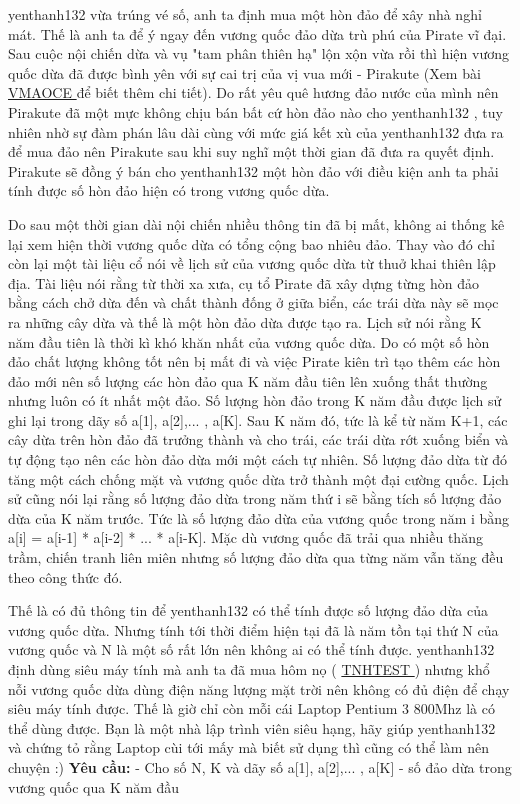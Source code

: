 yenthanh132 vừa trúng vé số, anh ta định mua một hòn đảo để xây nhà nghỉ mát. Thế là anh ta để ý ngay đến vương quốc đảo dừa trù phú của Pirate vĩ đại. Sau cuộc nội chiến dừa và vụ "tam phân thiên hạ" lộn xộn vừa rồi thì hiện vương quốc dừa đã được bình yên với sự cai trị của vị vua mới - Pirakute (Xem bài \href{../../VMAOCE/}{ VMAOCE } để biết thêm chi tiết). Do rất yêu quê hương đảo nước của mình nên Pirakute đã một mực không chịu bán bất cứ hòn đảo nào cho yenthanh132 , tuy nhiên nhờ sự đàm phán lâu dài cùng với mức giá kết xù của yenthanh132 đưa ra để mua đảo nên Pirakute sau khi suy nghĩ một thời gian đã đưa ra quyết định. Pirakute sẽ đồng ý bán cho yenthanh132 một hòn đảo với điều kiện anh ta phải tính được số hòn đảo hiện có trong vương quốc dừa.





Do sau một thời gian dài nội chiến nhiều thông tin đã bị mất, không ai thống kê lại xem hiện thời vương quốc dừa có tổng cộng bao nhiêu đảo. Thay vào đó chỉ còn lại một tài liệu cổ nói về lịch sử của vương quốc dừa từ thuở khai thiên lập địa. Tài liệu nói rằng từ thời xa xưa, cụ tổ Pirate đã xây dựng từng hòn đảo bằng cách chở dừa đến và chất thành đống ở giữa biển, các trái dừa này sẽ mọc ra những cây dừa và thế là một hòn đảo dừa được tạo ra. Lịch sử nói rằng K năm đầu tiên là thời kì khó khăn nhất của vương quốc dừa. Do có một số hòn đảo chất lượng không tốt nên bị mất đi và việc Pirate kiên trì tạo thêm các hòn đảo mới nên số lượng các hòn đảo qua K năm đầu tiên lên xuống thất thường nhưng luôn có ít nhất một đảo. Số lượng hòn đảo trong K năm đầu được lịch sử ghi lại trong dãy số a[1], a[2],... , a[K]. Sau K năm đó, tức là kể từ năm K+1, các cây dừa trên hòn đảo đã trưởng thành và cho trái, các trái dừa rớt xuống biển và tự động tạo nên các hòn đảo dừa mới một cách tự nhiên. Số lượng đảo dừa từ đó tăng một cách chống mặt và vương quốc dừa trở thành một đại cường quốc. Lịch sử cũng nói lại rằng số lượng đảo dừa trong năm thứ i sẽ bằng tích số lượng đảo dừa của K năm trước. Tức là số lượng đảo dừa của vương quốc trong năm i bằng a[i] = a[i-1] * a[i-2] * ... * a[i-K]. Mặc dù vương quốc đã trải qua nhiều thăng trầm, chiến tranh liên miên nhưng số lượng đảo dừa qua từng năm vẫn tăng đều theo công thức đó.





Thế là có đủ thông tin để yenthanh132 có thể tính được số lượng đảo dừa của vương quốc dừa. Nhưng tính tới thời điểm hiện tại đã là năm tồn tại thứ N của vương quốc và N là một số rất lớn nên không ai có thể tính được. yenthanh132 định dùng siêu máy tính mà anh ta đã mua hôm nọ ( \href{../../TNHTEST/}{ TNHTEST } ) nhưng khổ nỗi vương quốc dừa dùng điện năng lượng mặt trời nên không có đủ điện để chạy siêu máy tính được. Thế là giờ chỉ còn mỗi cái Laptop Pentium 3 800Mhz là có thể dùng được. Bạn là một nhà lập trình viên siêu hạng, hãy giúp yenthanh132 và chứng tỏ rằng Laptop cùi tới mấy mà biết sử dụng thì cũng có thể làm nên chuyện :)
\textbf{Yêu cầu: }
- Cho số N, K và dãy số a[1], a[2],... , a[K] - số đảo dừa trong vương quốc qua K năm đầu


